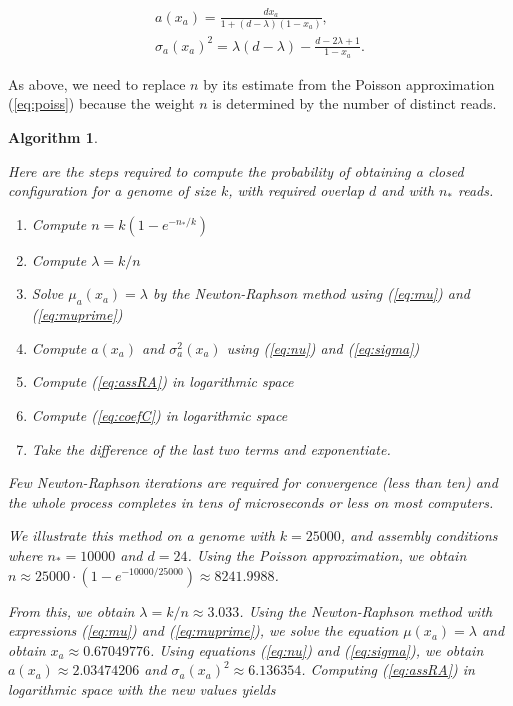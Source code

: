 \documentclass{article}
\newtheorem{algorithm}{Algorithm}
\begin{document}
\begin{gather}
\label{eq:nu} %
a(x_a) = \frac{dx_a}{1+(d-\lambda)(1-x_a)}, \\
\label{eq:sigma} %
\sigma_a(x_a)^2 = \lambda(d-\lambda) -
  \frac{d-2\lambda+1}{1-x_a}.
\end{gather}

As above, we need to replace $n$ by its estimate from the Poisson
approximation (\ref{eq:poiss}) because the weight $n$ is determined by the
number of distinct reads.


\begin{algorithm}
\label{alg:closure}

Here are the steps required to compute the probability of obtaining a
closed configuration for a genome of size $k$, with required overlap $d$
and with $n_*$ reads.

\begin{enumerate}
\item Compute $n = k(1-e^{-n_*/k})$
\item Compute $\lambda = k/n$
\item Solve $\mu_a(x_a) = \lambda$ by the Newton-Raphson method using
(\ref{eq:mu}) and (\ref{eq:muprime})
\item Compute $a(x_a)$ and $\sigma_a^2(x_a)$ using
(\ref{eq:nu}) and (\ref{eq:sigma})
\item Compute (\ref{eq:assRA}) in logarithmic space
\item Compute (\ref{eq:coefC}) in logarithmic space
\item Take the difference of the last two terms and exponentiate.
\end{enumerate}

Few Newton-Raphson iterations are required for convergence (less than ten)
and the whole process completes in tens of microseconds or less on most
computers.

We illustrate this method on a genome with $k = 25000$, and assembly
conditions where $n_* = 10000$ and $d=24$. Using the Poisson
approximation, we obtain $n \approx 25000 \cdot (1-e^{-10000/25000})
\approx 8241.9988$.

From this, we obtain $\lambda = k/n \approx 3.033$. Using the
Newton-Raphson method with expressions (\ref{eq:mu}) and
(\ref{eq:muprime}), we solve the equation $\mu(x_a) = \lambda$ and obtain
$x_a \approx 0.67049776$. Using equations (\ref{eq:nu}) and
(\ref{eq:sigma}), we obtain $a(x_a) \approx 2.03474206$ and
$\sigma_a(x_a)^2 \approx 6.136354$. Computing (\ref{eq:assRA}) in
logarithmic space with the new values yields


\end{algorithm}
\end{document}
